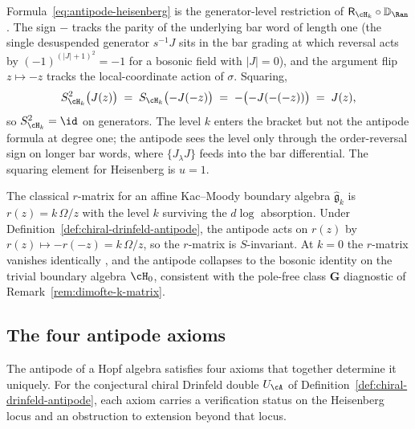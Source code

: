\begin{remark}
\label{rem:antipode-heisenberg-sanity}
Formula~\eqref{eq:antipode-heisenberg} is the generator-level
restriction of $\mathsf{R}_{\cH_k} \circ \mathbb{D}_{\Ran}$. The
sign $-$ tracks the parity of the underlying bar word of length one
(the single desuspended generator $s^{-1}J$ sits in the bar grading
at which reversal acts by $(-1)^{(|J|+1)^2} = -1$ for a bosonic
field with $|J| = 0$), and the argument flip $z \mapsto -z$ tracks
the local-coordinate action of $\sigma$. Squaring,
\[
S_{\cH_k}^{2}\bigl(J(z)\bigr)
\;=\; S_{\cH_k}\bigl(-J(-z)\bigr)
\;=\; -\bigl(-J(-(-z))\bigr)
\;=\; J(z),
\]
so $S_{\cH_k}^{2} = \id$ on generators. The level $k$ enters the
bracket but not the antipode formula at degree one; the antipode
sees the level only through the order-reversal sign on longer bar
words, where $\{J_\lambda J\}$ feeds into the bar differential.
The squaring element for Heisenberg is $u = 1$.
\end{remark}

\begin{remark}
\label{rem:antipode-r-matrix-check}
The classical $r$-matrix for an affine Kac--Moody boundary algebra
$\widehat{\mathfrak g}_k$ is $r(z) = k\,\Omega/z$ with the level $k$
surviving the $d\log$ absorption. Under
Definition~\ref{def:chiral-drinfeld-antipode}, the antipode acts on
$r(z)$ by $r(z) \mapsto -r(-z) = k\,\Omega/z$, so the $r$-matrix is
$S$-invariant. At $k = 0$ the $r$-matrix vanishes identically
, and the antipode collapses to the bosonic identity
on the trivial boundary algebra $\cH_0$, consistent with the
pole-free class $\mathbf{G}$ diagnostic of
Remark~\ref{rem:dimofte-k-matrix}.
\end{remark}

\subsection{The four antipode axioms}
\label{subsec:antipode-axioms}

The antipode of a Hopf algebra satisfies four axioms that together
determine it uniquely. For the conjectural chiral Drinfeld double
$U_\cA$ of Definition~\ref{def:chiral-drinfeld-antipode}, each axiom
carries a verification status on the Heisenberg locus and an
obstruction to extension beyond that locus.

